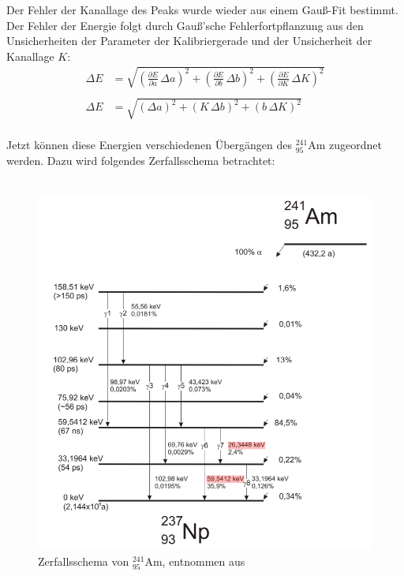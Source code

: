\documentclass[german,  %
parskip=full,  %
]{scrartcl}
\begin{document}
Der Fehler der Kanallage des Peaks wurde wieder aus einem Gauß-Fit bestimmt. Der Fehler der Energie folgt durch Gauß'sche Fehlerfortpflanzung aus den Unsicherheiten der Parameter der Kalibriergerade und der Unsicherheit der Kanallage $K$:
\\
\begin{align*}
\Delta E &= \sqrt{\left ( \frac{\partial E}{\partial a} \, \Delta a \right)^2 + \left (\frac{\partial E}{\partial b} \, \Delta b \right)^2+ \left( \frac{\partial E}{\partial K} \, \Delta K \right)^2} \\\\
\Delta E &= \sqrt{(\Delta a)^2 + (K \, \Delta b)^2 + (b \, \Delta K)^2}
\end{align*}
\\
Jetzt können diese Energien verschiedenen Übergängen des $^{241}_{95}$Am zugeordnet werden. 
\newpage
Dazu wird folgendes Zerfallsschema betrachtet:
\\\\
\begin{figure}[h!]\centering
\includegraphics[scale=0.5]{zerfallsschema}
\caption{Zerfallsschema von $^{241}_{95}$Am, entnommen aus \cite{Anleitung}}
\end{figure}
\\\\
\end{document}
